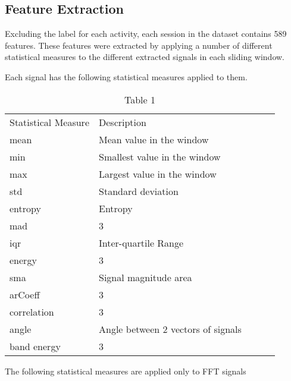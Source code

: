 \subsection{Feature Extraction}
    Excluding the label for each activity, each session in the dataset contains 589 features. These features were extracted by applying a number of different statistical
    measures to the different extracted signals in each sliding window.

    Each signal has the following statistical measures applied to them.

    \begin{table}[]
    \begin{tabular}{|l|l|lll}
    \cline{1-2}
    Statistical Measure & Description &  &  &  \\ \cline{1-2}
    mean             & Mean value in the window           &  &  &  \\ \cline{1-2}
    min            & Smallest value in the window           &  &  &  \\ \cline{1-2}
    max            & Largest value in the window           &  &  & \\ \cline{1-2}
    std            & Standard deviation           &  &  & \\ \cline{1-2}
    entropy            & Entropy           &  &  & \\ \cline{1-2}
    mad            & 3           &  &  & \\ \cline{1-2}
    iqr            & Inter-quartile Range           &  &  & \\ \cline{1-2}
    energy            & 3           &  &  & \\ \cline{1-2}
    sma            & Signal magnitude area           &  &  & \\ \cline{1-2}
    arCoeff            & 3           &  &  & \\ \cline{1-2}
    correlation            & 3           &  &  & \\ \cline{1-2}
    angle            & Angle between 2 vectors of signals           &  &  & \\ \cline{1-2}
    band energy            & 3           &  &  & \\ \cline{1-2}
    \end{tabular}
    \caption{Table 1}
    \label{tab:table-1}
    \end{table}

    The following statistical measures are applied only to FFT signals

